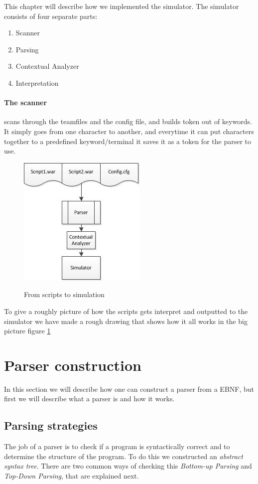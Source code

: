 This chapter will describe how we implemented the simulator. The simulator consists of four separate parts: \\
\begin{enumerate}
	\item Scanner
	\item Parsing
	\item Contextual Analyzer
	\item Interpretation
\end{enumerate}

\paragraph{The scanner} scans through the teamfiles and the config file, and builds token out of keywords. It simply goes from one character to another, and everytime it can put characters together to a predefined keyword/terminal it saves it as a token for the parser to use.


\begin{figure}[H]
\centering
\includegraphics[scale=1.2]{rapport/6/figures/script_to_simu}
\label{fig:script_to_simu}
\caption{From scripts to simulation}
\end{figure}

To give a roughly picture of how the scripts gets interpret and outputted to the simulator we have made a rough drawing that shows how it all works in the big picture figure \ref{fig:script_to_simu}

\section{Parser construction}
	In this section we will describe how one can construct a parser from a EBNF, but first we will describe what a parser is and how it works.
	
	\subsection{Parsing strategies}
		The job of a parser is to check if a program is syntactically correct and 
		to determine the structure of the program. To do this we constructed an {\it abstract syntax tree}.
		There are two common ways of checking this {\it Bottom-up Parsing} and {\it Top-Down Parsing}, that are explained next.
		
